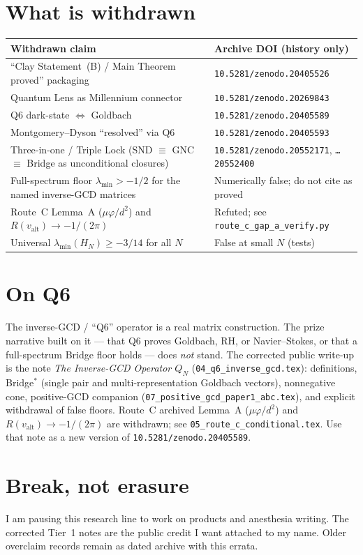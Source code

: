 \documentclass[11pt]{article}
\begin{document}
\section*{What is withdrawn}

\begin{center}
\renewcommand{\arraystretch}{1.25}
\begin{tabular}{>{\raggedright\arraybackslash}p{7.2cm}
                >{\raggedright\arraybackslash}p{6.5cm}}
\toprule
\textbf{Withdrawn claim} & \textbf{Archive DOI (history only)}\\
\midrule
\rowcolor{lightred}
``Clay Statement~(B) / Main Theorem proved'' packaging
& \texttt{10.5281/zenodo.20405526}\\
\rowcolor{lightred}
Quantum Lens as Millennium connector
& \texttt{10.5281/zenodo.20269843}\\
\rowcolor{lightred}
Q6 dark-state $\Leftrightarrow$ Goldbach
& \texttt{10.5281/zenodo.20405589}\\
\rowcolor{lightred}
Montgomery--Dyson ``resolved'' via Q6
& \texttt{10.5281/zenodo.20405593}\\
\rowcolor{lightred}
Three-in-one / Triple Lock
(SND $\equiv$ GNC $\equiv$ Bridge as unconditional closures)
& \texttt{10.5281/zenodo.20552171},
\texttt{\ldots20552400}\\
\rowcolor{lightred}
Full-spectrum floor $\lambda_{\min}>-1/2$
for the named inverse-GCD matrices
& Numerically false; do not cite as proved\\
\rowcolor{lightred}
Route~C Lemma~A ($\mu\varphi/d^2$) and $R(v_{\mathrm{alt}})\to -1/(2\pi)$
& Refuted; see \texttt{route\_c\_gap\_a\_verify.py}\\
\rowcolor{lightred}
Universal $\lambda_{\min}(H_N)\ge -3/14$ for all $N$
& False at small $N$ (tests)\\
\bottomrule
\end{tabular}
\end{center}

\section*{On Q6}

The inverse-GCD / ``Q6'' operator is a real matrix construction.
The prize narrative built on it --- that Q6 proves Goldbach, RH, or
Navier--Stokes, or that a full-spectrum Bridge floor holds --- does
\emph{not} stand.
The corrected public write-up is the note
\emph{The Inverse-GCD Operator \(Q_N\)}
(\texttt{04\_q6\_inverse\_gcd.tex}): definitions, Bridge$^*$
(single pair and multi-representation Goldbach vectors), nonnegative cone,
positive-GCD companion (\texttt{07\_positive\_gcd\_paper1\_abc.tex}),
and explicit withdrawal of false floors.
Route~C archived Lemma~A ($\mu\varphi/d^2$) and $R(v_{\mathrm{alt}})\to -1/(2\pi)$
are withdrawn; see \texttt{05\_route\_c\_conditional.tex}.
Use that note as a new version of
\texttt{10.5281/zenodo.20405589}.

\section*{Break, not erasure}

I am pausing this research line to work on products and anesthesia
writing. The corrected Tier~1 notes are the public credit I want
attached to my name. Older overclaim records remain as dated archive
with this errata.
\end{document}
